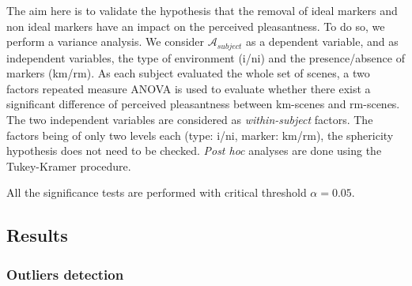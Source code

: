 \documentclass[12pt]{elsarticle}
\begin{document}

The aim here is to validate the hypothesis that the removal of ideal markers and non ideal markers have an impact on the perceived pleasantness. To do so, we perform a variance analysis. We consider $\mathcal{A}_{subject}$ as a dependent variable, and as independent variables, the type of environment (i/ni) and the presence/absence of markers (km/rm). As each subject evaluated the whole set of scenes, a two factors repeated measure ANOVA is used to evaluate whether there exist a significant difference of perceived pleasantness between km-scenes and rm-scenes. The two independent variables are considered as \emph{within-subject} factors. The factors being of only two levels each (type: i/ni,  marker: km/rm), the sphericity hypothesis does not need to be checked. \emph{Post hoc} analyses are done using the Tukey-Kramer procedure. %


All the significance tests are performed with critical threshold $\alpha=0.05$.

\subsection{Results}

\subsubsection{Outliers detection}
\end{document}
